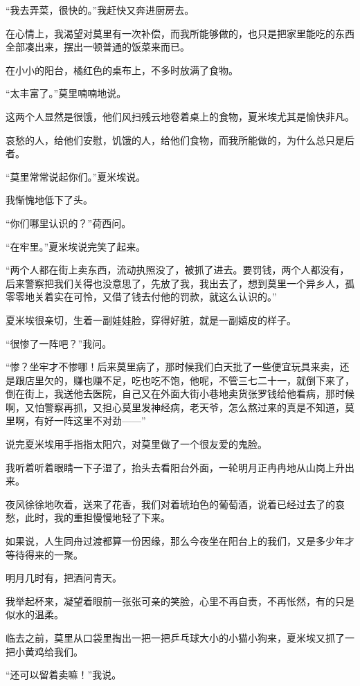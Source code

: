 \par “我去弄菜，很快的。”我赶快又奔进厨房去。
\par 在心情上，我渴望对莫里有一次补偿，而我所能够做的，也只是把家里能吃的东西全部凑出来，摆出一顿普通的饭菜来而已。
\par 在小小的阳台，橘红色的桌布上，不多时放满了食物。
\par “太丰富了。”莫里喃喃地说。
\par 这两个人显然是很饿，他们风扫残云地卷着桌上的食物，夏米埃尤其是愉快非凡。
\par 哀愁的人，给他们安慰，饥饿的人，给他们食物，而我所能做的，为什么总只是后者。
\par “莫里常常说起你们。”夏米埃说。
\par 我惭愧地低下了头。
\par “你们哪里认识的？”荷西问。
\par “在牢里。”夏米埃说完笑了起来。
\par “两个人都在街上卖东西，流动执照没了，被抓了进去。要罚钱，两个人都没有，后来警察把我们关得也没意思了，先放了我，我出去了，想到莫里一个异乡人，孤零零地关着实在可怜，又借了钱去付他的罚款，就这么认识的。”
\par 夏米埃很亲切，生着一副娃娃脸，穿得好脏，就是一副嬉皮的样子。
\par “很惨了一阵吧？”我问。
\par “惨？坐牢才不惨哪！后来莫里病了，那时候我们白天批了一些便宜玩具来卖，还是跟店里欠的，赚也赚不足，吃也吃不饱，他呢，不管三七二十一，就倒下来了，倒在街上，我送他去医院，自己又在外面大街小巷地卖货张罗钱给他看病，那时候啊，又怕警察再抓，又担心莫里发神经病，老天爷，怎么熬过来的真是不知道，莫里啊，有好一阵这里不对劲——”
\par 说完夏米埃用手指指太阳穴，对莫里做了一个很友爱的鬼脸。
\par 我听着听着眼睛一下子湿了，抬头去看阳台外面，一轮明月正冉冉地从山岗上升出来。
\par 夜风徐徐地吹着，送来了花香，我们对着琥珀色的葡萄酒，说着已经过去了的哀愁，此时，我的重担慢慢地轻了下来。
\par 如果说，人生同舟过渡都算一份因缘，那么今夜坐在阳台上的我们，又是多少年才等待得来的一聚。
\par 明月几时有，把酒问青天。
\par 我举起杯来，凝望着眼前一张张可亲的笑脸，心里不再自责，不再怅然，有的只是似水的温柔。
\par 临去之前，莫里从口袋里掏出一把一把乒乓球大小的小猫小狗来，夏米埃又抓了一把小黄鸡给我们。
\par “还可以留着卖嘛！”我说。
